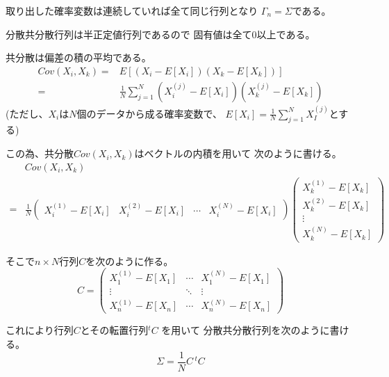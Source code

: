 \documentclass[12pt,b5paper]{ltjsarticle}
\begin{document}
\begin{enumerate}
\begin{enumerate}
            取り出した確率変数は連続していれば全て同じ行列となり
            $\Gamma_n = \Sigma$である。

            分散共分散行列は半正定値行列であるので
            固有値は全て0以上である。

\dotfill

            共分散は偏差の積の平均である。
            \begin{align}
             Cov(X_i,X_k)=&E[(X_i-E[X_i])(X_k-E[X_k])]\\
             =&\frac{1}{N}\sum_{j=1}^{N}
             (X_i^{(j)}-E[X_i])(X_k^{(j)}-E[X_k])
            \end{align}
            (ただし、$X_i$は$N$個のデータから成る確率変数で、
            $E[X_i]=\frac{1}{N}\sum_{j=1}^{N}X_I^{(j)}$とする)

            この為、共分散$Cov(X_i,X_k)$はベクトルの内積を用いて
            次のように書ける。
            \begin{align}
             & Cov(X_i,X_k)\\
             =&
              \frac{1}{N}
              \begin{pmatrix}
               X_i^{(1)}-E[X_i] & X_i^{(2)}-E[X_i] &
               \cdots & X_i^{(N)}-E[X_i]
              \end{pmatrix}
              \begin{pmatrix}
               X_k^{(1)}-E[X_k] \\ X_k^{(2)}-E[X_k] \\
               \vdots \\ X_k^{(N)}-E[X_k]
              \end{pmatrix}
            \end{align}

            そこで$n\times N$行列$C$を次のように作る。
            \begin{equation}
             C=
              \begin{pmatrix}
               X_1^{(1)}-E[X_1] & \cdots & X_1^{(N)}-E[X_1]\\
               \vdots & \ddots & \vdots\\
               X_n^{(1)}-E[X_n] & \cdots & X_n^{(N)}-E[X_n]
              \end{pmatrix}
            \end{equation}

            これにより行列$C$とその転置行列${}^{t}\!C$
            を用いて
            分散共分散行列を次のように書ける。
            \begin{equation}
             \Sigma = \frac{1}{N}C\, {}^{t}\!C
            \end{equation}



\end{enumerate}
\end{enumerate}
\end{document}
